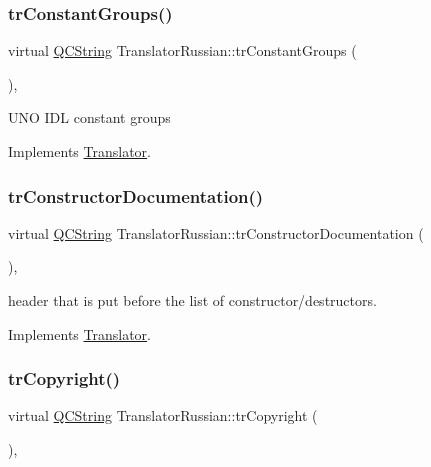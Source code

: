 \subsubsection{\texorpdfstring{trConstantGroups()}{trConstantGroups()}}
{\footnotesize\ttfamily virtual \mbox{\hyperlink{class_q_c_string}{Q\+C\+String}} Translator\+Russian\+::tr\+Constant\+Groups (\begin{DoxyParamCaption}{ }\end{DoxyParamCaption})\hspace{0.3cm}{\ttfamily [inline]}, {\ttfamily [virtual]}}

U\+NO I\+DL constant groups 

Implements \mbox{\hyperlink{class_translator}{Translator}}.

\mbox{\label{class_translator_russian_a0423cb045ca4b0917af9e032b8014655}} 
\subsubsection{\texorpdfstring{trConstructorDocumentation()}{trConstructorDocumentation()}}
{\footnotesize\ttfamily virtual \mbox{\hyperlink{class_q_c_string}{Q\+C\+String}} Translator\+Russian\+::tr\+Constructor\+Documentation (\begin{DoxyParamCaption}{ }\end{DoxyParamCaption})\hspace{0.3cm}{\ttfamily [inline]}, {\ttfamily [virtual]}}

header that is put before the list of constructor/destructors. 

Implements \mbox{\hyperlink{class_translator}{Translator}}.

\mbox{\label{class_translator_russian_a56054f5e588c5ebd8b86644580dceb64}} 
\subsubsection{\texorpdfstring{trCopyright()}{trCopyright()}}
{\footnotesize\ttfamily virtual \mbox{\hyperlink{class_q_c_string}{Q\+C\+String}} Translator\+Russian\+::tr\+Copyright (\begin{DoxyParamCaption}{ }\end{DoxyParamCaption})\hspace{0.3cm}{\ttfamily [inline]}, {\ttfamily [virtual]}}


